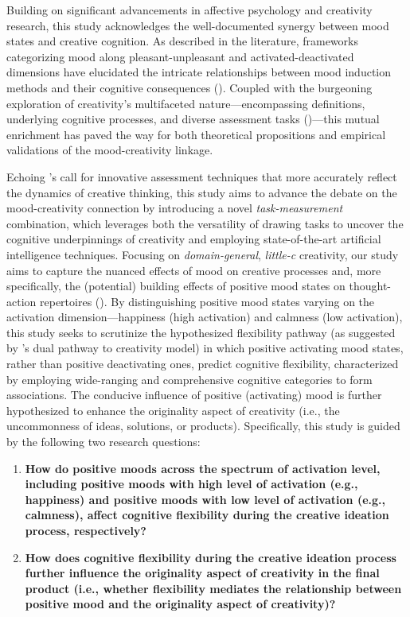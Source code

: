 \documentclass[../MA_Thesis.tex]{subfiles}
\begin{document}
Building on significant advancements in affective psychology and creativity research, this study acknowledges the well-documented synergy between mood states and creative cognition. As described in the literature, frameworks categorizing mood along pleasant-unpleasant and activated-deactivated dimensions have elucidated the intricate relationships between mood induction methods and their cognitive consequences (\cite{siedlecka_experimental_2019}). Coupled with the burgeoning exploration of creativity's multifaceted nature---encompassing definitions, underlying cognitive processes, and diverse assessment tasks (\cite{kaufman_cambridge_2010})---this mutual enrichment has paved the way for both theoretical propositions and empirical validations of the mood-creativity linkage.

Echoing \textcite{kaufman_cambridge_2010}'s call for innovative assessment techniques that more accurately reflect the dynamics of creative thinking, this study aims to advance the debate on the mood-creativity connection by introducing a novel \textit{task-measurement} combination, which leverages both the versatility of drawing tasks to uncover the cognitive underpinnings of creativity and employing state-of-the-art artificial intelligence techniques. Focusing on \textit{domain-general}, \textit{little-c} creativity, our study aims to capture the nuanced effects of mood on creative processes and, more specifically, the (potential) building effects of positive mood states on thought-action repertoires (\cite{fredrickson_role_2001}). By distinguishing positive mood states varying on the activation dimension---happiness (high activation) and calmness (low activation), this study seeks to scrutinize the hypothesized flexibility pathway (as suggested by \textcite{de_dreu_hedonic_2008}'s dual pathway to creativity model) in which positive activating mood states, rather than positive deactivating ones, predict cognitive flexibility, characterized by employing wide-ranging and comprehensive cognitive categories to form associations. The conducive influence of positive (activating) mood is further hypothesized to enhance the originality aspect of creativity (i.e., the uncommonness of ideas, solutions, or products). Specifically, this study is guided by the following two research questions:  
\begin{enumerate}
    \item \textbf{How do positive moods across the spectrum of activation level, including positive moods with high level of activation (e.g., happiness) and positive moods with low level of activation (e.g., calmness), affect cognitive flexibility during the creative ideation process, respectively?}
    \item \textbf{How does cognitive flexibility during the creative ideation process further influence the originality aspect of creativity in the final product (i.e., whether flexibility mediates the relationship between positive mood and the originality aspect of creativity)?}
\end{enumerate}
\end{document}
